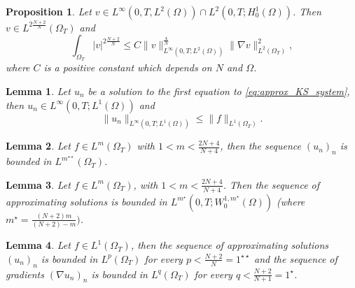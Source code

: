 \documentclass[10pt,a4paper]{amsart}
\newtheorem{prop}{Proposition}
\newtheorem{lemma}{Lemma}
\def\Hom{H^1_0(\Omega)}
\def\Sobom#1{W^{1,#1}_0(\Omega)}
\newcommand{\abs}[1]{\left|#1\right|}
\def\elle#1{L^{#1}}
\def\elleom#1{L^{#1}(\Omega)}
\def\elleomT#1{L^{#1}(\Omega_T)}
\def\ioT{\int_{\Omega_T}}
\def\norma#1#2{ \|#1 \|_{#2}}
\begin{document}
\begin{prop}\label{GNSparabTheo}
    Let $v\in\elle\infty(0,T,\elleom2)\cap\elle2(0,T;\Hom)$. Then $v\in\elle{2\frac{N+2}{N}}(\Omega_T)$  and
    \begin{equation}\label{GNSparabEQ}
        \ioT \abs{v}^{2\frac{N+2}{N}}
        \leq C
        \norma{v}{\elle\infty(0,T;\elleom2)}^\frac{4}{N}\norma{\nabla v}{\elle2(\Omega_T)}^2,      
    \end{equation}
    where $C$ is a positive constant which depends on $N$ and $\Omega$.
\end{prop}

\begin{lemma}\label{StimaL1ParabEll}
Let $u_n$ be a solution to the first equation to \eqref{eq:approx_KS_system}, then $u_n\in\elle\infty(0,T;\elleom1)$ and
$$\norma{u_n}{\elle\infty(0,T;\elleom1)}\leq \norma{f}{\elle1(\Omega_T)}.$$
\end{lemma}

\begin{lemma}\label{lemma:stima_m**_unif:infinite_energy}
    Let $f\in\elle m (\Omega_T)$ with $1<m<\frac{2N+4}{N+4}$, then the sequence $(u_n)_n$ is bounded in $\elleomT {m^{\star\star}}$.
\end{lemma}

\begin{lemma}\label{lemma:u_nW1m*_KS_parabell}
    Let $f\in\elleomT m$, with $1<m<\frac{2N+4}{N+4}$. Then the sequence of approximating solutions is bounded in $\elle {m^\star}(0,T;\Sobom{m^\star})$ (where ${m^\star}=\frac{(N+2)m}{(N+2)-m})$.
\end{lemma}

\begin{lemma}\label{lemma:stima1**}
    Let $f\in\elleomT1$, then the sequence of approximating solutions $(u_n)_n$ is bounded in $\elleomT p$ for every $p<\frac{N+2}{N}=1^{\star\star}$ and the sequence of gradients $(\nabla u_n)_n$ is bounded in $\elleomT q$ for every $q<\frac{N+2}{N+1}=1^{\star}$.
\end{lemma}
\end{document}
